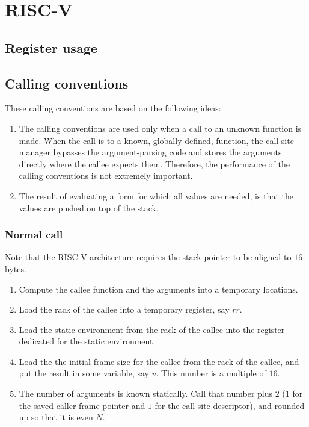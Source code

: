 \chapter{RISC-V}
\label{chapter-backend-risc-v}

\section{Register usage}
\label{sec-backend-risc-v-register-usage}

\section{Calling conventions}
\label{sec-backend-risc-v-calling-conventions}

These calling conventions are based on the following ideas:

\begin{enumerate}
\item The calling conventions are used only when a call to an unknown
  function is made.  When the call is to a known, globally defined,
  function, the call-site manager bypasses the argument-parsing code
  and stores the arguments directly where the callee expects them.
  Therefore, the performance of the calling conventions is not
  extremely important.
\item The result of evaluating a form for which all values are needed,
  is that the values are pushed on top of the stack.
\end{enumerate}

\subsection{Normal call}

Note that the RISC-V architecture requires the stack pointer to be
aligned to $16$ bytes.

\begin{enumerate}
\item Compute the callee function and the arguments into a temporary
  locations.
\item Load the rack of the callee into a temporary register, say $rr$.
\item Load the static environment from the rack of the callee into the
  register dedicated for the static environment.
\item  Load the the initial frame size for the callee from the rack of
  the callee, and put the result in some variable, say
  $v$.  This number is a multiple of $16$.
\item The number of arguments is known statically.  Call that number
  plus $2$ ($1$ for the saved caller frame pointer and $1$ for the
  call-site descriptor), and rounded up so that it is even $N$.  

\end{enumerate}

